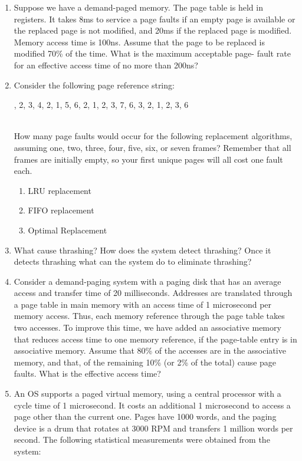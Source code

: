 \documentclass{article}
\begin{document}
\begin{enumerate}
		\item Suppose we have a demand-paged memory. The page table is held in registers. It takes 8ms to service a page faults if an empty page is available or the replaced page is not modified, and 20ms if the replaced page is modified. Memory access time is 100ns. Assume that the page to be replaced is modified 70\% of the time. What is the maximum acceptable page- fault rate for an effective access time of no more than 200ns?
		\item Consider the following page reference string:
		\begin{figure*}[h]
			, 2, 3, 4, 2, 1, 5, 6, 2, 1, 2, 3, 7, 6, 3, 2, 1, 2, 3, 6
		\end{figure*}\\
		How many page faults would occur for the following replacement algorithms, assuming one, two, three, four, five, six, or seven frames? Remember that all frames are initially empty, so your first unique pages will all cost one fault each.
		\begin{enumerate}
			\item LRU replacement
			\item FIFO replacement
			\item Optimal Replacement
		\end{enumerate}
		\item What cause thrashing? How does the system detect thrashing? Once it detects thrashing what can the system do to eliminate thrashing?
		\item Consider a demand-paging system with a paging disk that has an average access and transfer time of 20 milliseconds. Addresses are translated through a page table in main memory with an access time of 1 microsecond per memory access. Thus, each memory reference through the page table takes two accesses. To improve this time, we have added an associative memory that reduces access time to one memory reference, if the page-table entry is in associative memory. Assume that 80\% of the accesses are in the associative memory, and that, of the remaining 10\% (or 2\% of the total) cause page faults. What is the effective access time?
		\item An OS supports a paged virtual memory, using a central processor with a cycle time of 1 microsecond. It costs an additional 1 microsecond to access a page other than the current one. Pages have 1000 words, and the paging device is a drum that rotates at 3000 RPM and transfers 1 million words per second. The following statistical measurements were obtained from the system:

\end{enumerate}
\end{document}
